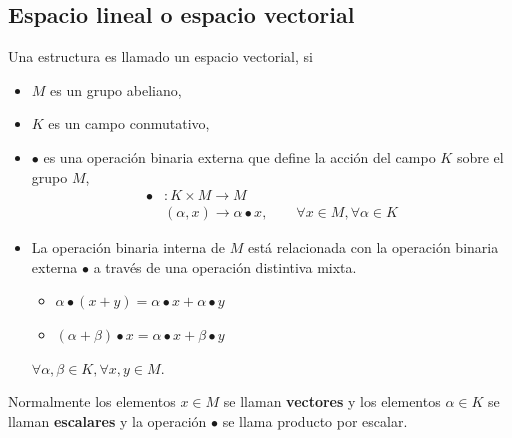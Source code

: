 \subsection{Espacio lineal o espacio vectorial}
\begin{defi}
	Una estructura \espvec es llamado un espacio vectorial, si
	\begin{itemize}
		\item $M$ es un grupo abeliano,
		\item $K$ es un campo conmutativo,
		\item $\bullet$ es una operación binaria externa que define la acción del campo $K$ sobre el grupo $M$,
		\begin{align}
  \bullet &:K\times M\to M\\
  &(\alpha,x)\to \alpha \bullet x,\qquad\forall x\in M, \forall\alpha\in K
\end{align}
\item La operación binaria interna de $M$ está relacionada con la operación binaria externa $\bullet$ a través de una operación distintiva mixta. 
\begin{itemize}
	\item $\alpha \bullet (x+y)=\alpha\bullet x+\alpha\bullet y$
	\item $(\alpha + \beta)\bullet x = \alpha\bullet x+\beta\bullet y$
\end{itemize}
$\forall \alpha,\beta\in K,\forall x,y\in M$.
	\end{itemize}
\end{defi}

Normalmente los elementos $x\in M$ se llaman \textbf{vectores} y los elementos $\alpha\in K$ se llaman \textbf{escalares} y la operación $\bullet$ se llama producto por escalar.

